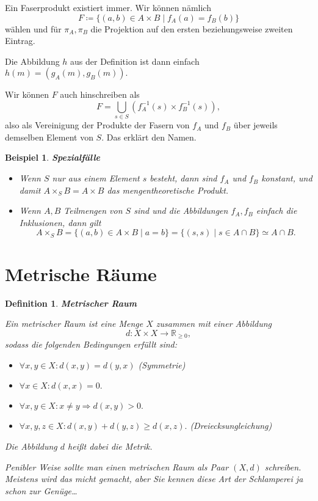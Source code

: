\documentclass[12pt]{scrbook}   %
\newtheorem{definiX}[alles]{Definition}
\newenvironment{defini}[1]{\begin{definiX}{\bf #1}\par\rm}{\end{definiX}}
\newtheorem{bspX}[alles]{Beispiel}
\newenvironment{bsp}[1]{\begin{bspX}{\bf #1}\par\rm}{\end{bspX}}
\newcommand{\da}{\coloneqq}
\begin{document}
\medskip

Ein Faserprodukt existiert immer. Wir können nämlich 
$$F\da\{(a,b)\in A\times B \mid f_A(a) = f_B(b)\} $$
wählen und für $\pi_A,\pi_B$ die Projektion auf den ersten beziehungsweise
zweiten Eintrag. 

Die Abbildung $h$ aus der Definition ist dann einfach $h(m) = (g_A(m), g_B(m)).$

Wir können $F$ auch hinschreiben als 
$$F=\bigcup_{s\in S} \left(f_A^{-1}(s) \times f_B^{-1}(s)\right),$$
also als Vereinigung der Produkte der Fasern von $f_A$ und $f_B$ über jeweils
demselben Element von $S.$ Das erklärt den Namen.

\begin{bsp} {\bf Spezialfälle}

{\rm 
\begin{itemize}
\item[a)] Wenn $S$ nur aus einem Element $s$ besteht, dann sind $f_A$ und $f_B$
konstant, und damit $A\times_SB = A\times B$ das mengentheoretische Produkt.
\item[b)] Wenn $A,B$ Teilmengen von $S$ sind und die Abbildungen $f_A,f_B$ 
einfach die Inklusionen, dann gilt
$$A\times_SB = \{(a,b)\in A\times B\mid a=b\} = \{(s,s)\mid s\in A\cap B\} 
\simeq A\cap B.$$
\end{itemize}
}
\end{bsp}

\section{Metrische Räume}

\begin{defini} {\bf Metrischer Raum} 

{\rm Ein {\it metrischer Raum} ist eine Menge $X$ 
zusammen mit einer Abbildung $$d:X\times X\longrightarrow \mathbb R_{\geq 0},$$
sodass die folgenden Bedingungen erfüllt sind:
\begin{itemize}
\item $\forall x,y\in X: d(x,y) = d(y,x)$ (Symmetrie)
\item $\forall x\in X: d(x,x) = 0.$
\item $\forall x,y\in X: x\neq y\Rightarrow d(x,y) >0.$
\item $\forall x,y,z\in X: d(x,y) + d(y,z) \geq d(x,z).$ (Dreiecksungleichung)
\end{itemize}
Die Abbildung $d$ heißt dabei die {\it Metrik}.

Penibler Weise sollte man einen metrischen Raum als Paar $(X,d)$ schreiben.
Meistens wird das micht gemacht, aber Sie kennen diese Art der Schlamperei ja
schon zur Genüge\ldots
}\end{defini}
\end{document}
